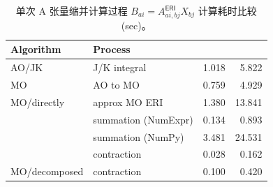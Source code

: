 \begin{table}[h]
  \centering
  \caption{单次 A 张量缩并计算过程 $B_{ai} = A_{ai, bj}^\textsf{ERI} X_{bj}$ 计算耗时比较 (sec)。}
  \label{tab.A-tensor-contraction-MO}
  \begin{tabular}{ll:d{2.4}d{2.4}}
  \hline
  Algorithm     & Process  &  &  \\ \hline
  AO/JK         & J/K integral        & 1.018 & 5.822  \\
  MO            & AO to MO            & 0.759 & 4.929  \\
  MO/directly   & approx MO ERI       & 1.380 & 13.841 \\
                & summation (NumExpr) & 0.134 & 0.893  \\
                & summation (NumPy)   & 3.481 & 24.531 \\
                & contraction         & 0.028 & 0.162  \\
  MO/decomposed & contraction         & 0.100 & 0.420  \\ \hline
  \end{tabular}


\end{table}
